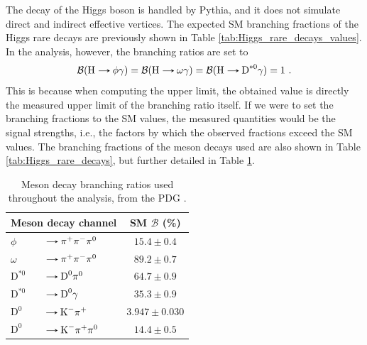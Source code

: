 The decay of the Higgs boson is handled by Pythia, and it does not simulate direct and indirect effective vertices. The expected SM branching fractions of the Higgs rare decays are previously shown in Table \ref{tab:Higgs_rare_decays_values}.%
In the analysis, however, the branching ratios are set to
\begin{equation*}
    \mathcal{B}(\text{H}\decaysto \phi\gamma) = \mathcal{B}(\text{H}\decaysto \omega\gamma) = \mathcal{B}(\text{H}\decaysto \text{D}^{*0}\gamma) = 1\ .
\end{equation*}
This is because when computing the upper limit, the obtained value is directly the measured upper limit of the branching ratio itself. If we were to set the branching fractions to the SM values, the measured quantities would be the signal strengths, i.e., the factors by which the observed fractions exceed the SM values. The branching fractions of the meson decays used are also shown in Table \ref{tab:Higgs_rare_decays}, but further detailed in Table \ref{tab:Meson_decay_br}.

\begin{table}[!ht]
    \centering
    \begin{tabular}{|l@{}l|c|}
        \hline
        \multicolumn{2}{|c|}{\cellcolor{lightgray}Meson decay channel} & \multicolumn{1}{c|}{\cellcolor{lightgray} SM $\mathcal{B}$ (\%)} \\ \hline
        $\phi$&$\decaysto \pi^+\pi^-\pi^0$     & $15.4 \pm 0.4$   \\
        $\omega$&$\decaysto \pi^+\pi^-\pi^0$   & $89.2 \pm 0.7$   \\
        $\text{D}^{*0}$&$\decaysto \text{D}^{0}\pi^0$        & $64.7 \pm 0.9$   \\
        $\text{D}^{*0}$&$\decaysto \text{D}^{0}\gamma$       & $35.3 \pm 0.9$   \\
        $\text{D}^{0}$&$\decaysto \text{K}^{-}\pi^{+}$           & $3.947 \pm 0.030$   \\
        $\text{D}^{0}$&$\decaysto \text{K}^{-}\pi^{+}\pi^0$      & $14.4 \pm 0.5$   \\
        \hline
    \end{tabular}
    \caption{Meson decay branching ratios used throughout the analysis, from the PDG \cite{PDG}.}
    \label{tab:Meson_decay_br}
\end{table}

